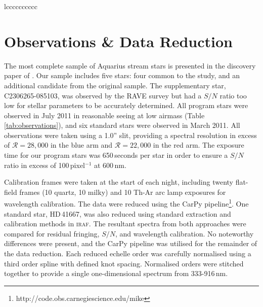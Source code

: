 \documentclass{emulateapj}
\begin{document}
\begin{deluxetable*}{lcccccccccc}

\enddata
{}
\end{deluxetable*}


\section{Observations \& Data Reduction}

The most complete sample of Aquarius stream stars is presented in the discovery paper of \citet{williams;et-al_2011}. Our sample includes five stars: four common to the \citet{wylie-de-boer;et-al_2012} study, and an additional candidate from the original \citet{williams;et-al_2011} sample. The supplementary star, C2306265-085103, was observed by the RAVE survey but had a $S/N$ ratio too low for stellar parameters to be accurately determined. All program stars were observed in July 2011 in reasonable seeing at low airmass (Table \ref{tab:observations}), and six  standard stars were observed in March 2011. All observations were taken using a 1.0'' slit, providing a spectral resolution in excess of $\mathcal{R} = 28,000$ in the blue arm and $\mathcal{R} = 22,000$ in the red arm. The exposure time for our program stars was 650\,seconds per star in order to ensure a $S/N$ ratio in excess of 100\,pixel$^{-1}$ at 600\,nm.

Calibration frames were taken at the start of each night, including twenty flat-field frames (10 quartz, 10 milky) and 10 Th-Ar arc lamp exposures for wavelength calibration. The data were reduced using the CarPy pipeline\footnote{http://code.obs.carnegiescience.edu/mike}. One standard star, HD\,41667, was also reduced using standard extraction and calibration methods in \textsc{iraf}. The resultant spectra from both approaches were compared for residual fringing, $S/N$, and wavelength calibration. No noteworthy differences were present, and the CarPy pipeline was utilised for the remainder of the data reduction. Each reduced echelle order was carefully normalised using a third order spline with defined knot spacing. Normalised orders were stitched together to provide a single one-dimensional spectrum from 333-916\,nm. 
 
\end{document}
